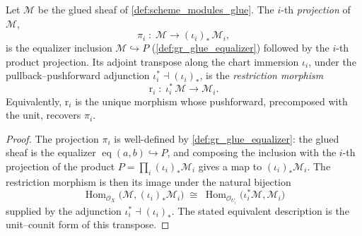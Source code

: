 \begin{lemma}

  \label{lem:glueRestrictionHom}
  Let \(\mathcal{M}\) be the glued sheaf of \cref{def:scheme_modules_glue}. The
  \(i\)-th \emph{projection} of \(\mathcal{M}\),
  \[
    \pi_i \;:\; \mathcal{M} \longrightarrow (\iota_i)_{*}\,\mathcal{M}_i,
  \]
  is the equalizer inclusion \(\mathcal{M} \hookrightarrow P\)
  (\cref{def:gr_glue_equalizer}) followed by the \(i\)-th product projection. Its
  adjoint transpose along the chart immersion \(\iota_i\), under the
  pullback--pushforward adjunction \(\iota_i^{*} \dashv (\iota_i)_{*}\), is the
  \emph{restriction morphism}
  \[
    \mathrm{r}_i \;:\; \iota_i^{*}\,\mathcal{M} \longrightarrow \mathcal{M}_i .
  \]
  Equivalently, \(\mathrm{r}_i\) is the unique morphism whose pushforward, precomposed
  with the unit, recovers \(\pi_i\).
\end{lemma}
\begin{proof}
  \leanok
  The projection \(\pi_i\) is well-defined by \cref{def:gr_glue_equalizer}: the glued
  sheaf is the equalizer \(\operatorname{eq}(a,b) \hookrightarrow P\), and composing
  the inclusion with the \(i\)-th projection of the product \(P = \prod_i
  (\iota_i)_{*}\mathcal{M}_i\) gives a map to \((\iota_i)_{*}\mathcal{M}_i\). The
  restriction morphism is then its image under the natural bijection
  \[
    \operatorname{Hom}_{\mathcal{O}_X}\bigl(\mathcal{M}, (\iota_i)_{*}\mathcal{M}_i\bigr)
      \;\cong\;
    \operatorname{Hom}_{\mathcal{O}_{U_i}}\bigl(\iota_i^{*}\mathcal{M}, \mathcal{M}_i\bigr)
  \]
  supplied by the adjunction \(\iota_i^{*} \dashv (\iota_i)_{*}\). The stated
  equivalent description is the unit--counit form of this transpose.
\end{proof}

